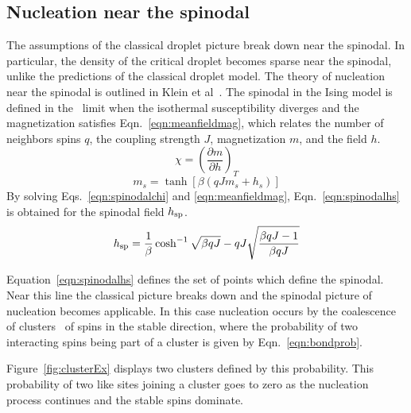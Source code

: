 \subsection{Nucleation near the spinodal}
\label{spinodalnuctheory}
The assumptions of the classical droplet picture break down near the spinodal. In particular, the density of the critical droplet becomes sparse near the spinodal, unlike the predictions of the classical droplet model. The theory of nucleation near the spinodal is outlined in Klein et al~\cite{klein07}. 
The spinodal in the Ising model is  defined in the \mf\ limit when the isothermal susceptibility diverges and the magnetization satisfies  Eqn.~\eqref{eqn:meanfieldmag}, which relates the number of neighbors spins $q$, the coupling strength $J$, magnetization $m$, and the field $h$. %
\begin{equation}
	\chi = (\frac{\partial m}{\partial h})_T
	\label{eqn:spinodalchi}
\end{equation}%
\begin{equation}
	m_s = \tanh[\beta(qJ m_s+h_s)]
	\label{eqn:meanfieldmag}
\end{equation}%
By solving Eqs.~\eqref{eqn:spinodalchi} and \eqref{eqn:meanfieldmag}, Eqn.~\eqref{eqn:spinodalhs} is obtained for the spinodal field  $h_{\rm sp}$.
\begin{equation}
h_{\rm sp} = \frac{1}{\beta} \cosh^{-1} \sqrt{\beta q J} - qJ  \sqrt{ \frac{\beta q J - 1}{\beta q J} }
\label{eqn:spinodalhs}
\end{equation}%

Equation~\eqref{eqn:spinodalhs} defines the set of points which define the spinodal. Near this line the classical picture breaks down and the spinodal picture of nucleation becomes applicable. In this case nucleation occurs by the coalescence of clusters~\cite{monette92,klein07} of spins in the stable direction, where the probability of two interacting spins being part of a cluster is given by Eqn.~\eqref{eqn:bondprob}.

Figure~\ref{fig:clusterEx} displays two clusters defined by this probability. This probability of two like sites joining a cluster goes to zero as the nucleation process continues and the stable spins dominate.

